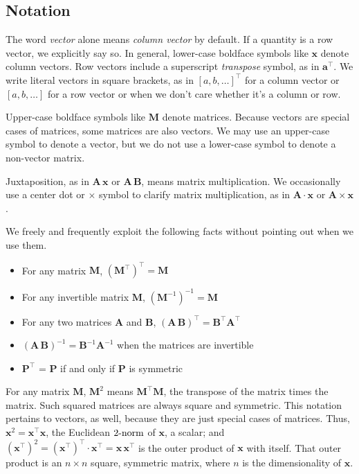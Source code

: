 \documentclass[10pt,oneside,x11names]{article}
\begin{document}
\subsection{Notation}
\label{sec:orgheadline3}

The word \emph{vector} alone means \emph{column vector} by default. If a quantity is a row
vector, we explicitly say so.
In general, lower-case boldface symbols like \(\mathbold{x}\) denote column
vectors.
Row vectors include a superscript \emph{transpose} symbol, as in
\(\mathbold{a}^\intercal\).
We write literal vectors in square brackets, as in
\(\left[a, b, \ldots\right]^\intercal\) for a column vector or
\(\left[a, b, \ldots\right]\) for a row vector or when we don't care whether
it's a column or row.


Upper-case
boldface symbols like \(\mathbold{M}\) denote matrices. Because vectors are
special cases of matrices, some matrices are also vectors. We may use an
upper-case symbol to denote a vector, but we do not use a lower-case symbol to
denote a non-vector matrix.

Juxtaposition, as in
\(\mathbold{A}\,\mathbold{x}\) or \(\mathbold{A}\,\mathbold{B}\), means matrix multiplication.
We occasionally use a center dot or \(\times\) symbol to clarify matrix
multiplication, as in \(\mathbold{A}\cdot\mathbold{x}\) or
\(\mathbold{A}\times\mathbold{x}\). 


We freely and frequently exploit the following facts without pointing out when
we use them.
\begin{itemize}
\item For any matrix \(\mathbold{M}\), \(\left(\mathbold{M}^\intercal\right)^\intercal = \mathbold{M}\)
\item For any invertible matrix \(\mathbold{M}\), \(\left(\mathbold{M}^{-1}\right)^{-1} = \mathbold{M}\)
\item For any two matrices \(\mathbold{A}\) and
\(\mathbold{B}\),
\(\left(\mathbold{A}\,\mathbold{B}\right)^\intercal=\mathbold{B}^\intercal\mathbold{A}^\intercal\)
\item \(\left(\mathbold{A}\,\mathbold{B}\right)^{-1}=\mathbold{B}^{-1}\mathbold{A}^{-1}\)
  when the matrices are invertible
\item \(\mathbold{P}^\intercal\) = \(\mathbold{P}\) if and only if \(\mathbold{P}\) is
symmetric
\end{itemize}

For any matrix \(\mathbold{M}\), \(\mathbold{M}^2\) means
\(\mathbold{M}^\intercal\mathbold{M}\), the transpose of the matrix times the
matrix. Such squared matrices are always square and symmetric.
This notation pertains to vectors, as well, because they are just
special cases of matrices. Thus,
\(\mathbold{x}^2=\mathbold{x}^\intercal\mathbold{x}\), the Euclidean
\(\mbox{2-\textrm{norm}}\) of \(\mathbold{x}\), a scalar; and
\((\mathbold{x}^\intercal)^2 =
(\mathbold{x}^\intercal)^\intercal\cdot
\mathbold{x}^\intercal=
\mathbold{x}\,\mathbold{x}^\intercal\)
is the outer product of \(\mathbold{x}\) with itself. That outer product is an
\(n\times{n}\) square, symmetric matrix, where \(n\) is the dimensionality of \(\mathbold{x}\). 
\end{document}
